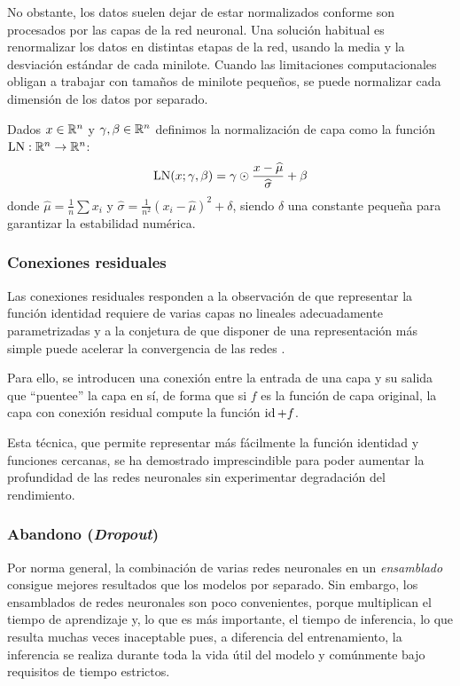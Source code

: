 No obstante, los datos suelen dejar de estar normalizados conforme son procesados por las capas de la red neuronal. Una solución habitual es renormalizar los datos en distintas etapas de la red, usando la media y la desviación estándar de cada minilote. Cuando las limitaciones computacionales obligan a trabajar con tamaños de minilote pequeños, se puede normalizar cada dimensión de los datos por separado. 

\begin{definition}
    Dados \( x \in \mathbb{R}^{n} \) y \( \gamma, \beta \in \mathbb{R}^{n} \) definimos la normalización de capa como la función \( \operatorname{LN}: \mathbb{R}^{n} \to \mathbb{R}^{n} \):
    \[
        \operatorname{LN}(x; \gamma, \beta) = \gamma \odot \frac{x - \widehat{\mu}}{\widehat{\sigma}} + \beta
    \]
    donde \( \widehat{\mu} = \frac{1}{n} \sum x_i \) y \( \widehat{\sigma} = \frac{1}{n^2} (x_i - \widehat{\mu})^2 + \delta \), siendo \( \delta \) una constante pequeña para garantizar la estabilidad numérica.
\end{definition}

\subsubsection{Conexiones residuales}
Las conexiones residuales responden a la observación de que representar la función identidad requiere de varias capas no lineales adecuadamente parametrizadas y a la conjetura de que disponer de una representación más simple puede acelerar la convergencia de las redes \cite{he2016deep}.

Para ello, se introducen una conexión entre la entrada de una capa 
 y su salida que ``puentee'' la capa en sí, de forma que si \( f \) es la función de capa original, la capa con conexión residual compute la función \( \operatorname{id} + f \). 

Esta técnica, que permite representar más fácilmente la función identidad y funciones cercanas, se ha demostrado imprescindible para poder aumentar la profundidad de las redes neuronales sin experimentar degradación del rendimiento.

\subsubsection{Abandono (\textit{Dropout})}
Por norma general, la combinación de varias redes neuronales en un \textit{ensamblado} consigue mejores resultados que los modelos por separado. Sin embargo, los ensamblados de redes neuronales son poco convenientes, porque multiplican el tiempo de aprendizaje y, lo que es más importante, el tiempo de inferencia, lo que resulta muchas veces inaceptable pues, a diferencia del entrenamiento, la inferencia se realiza durante toda la vida útil del modelo y comúnmente bajo requisitos de tiempo estrictos.

